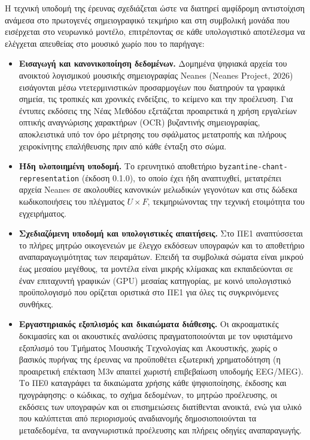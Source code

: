 \documentclass[11pt,a4paper]{article}
\begin{document}
Η τεχνική υποδομή της έρευνας σχεδιάζεται ώστε να διατηρεί αμφίδρομη αντιστοίχιση ανάμεσα στο πρωτογενές σημειογραφικό τεκμήριο και στη συμβολική μονάδα που εισέρχεται στο νευρωνικό μοντέλο, επιτρέποντας σε κάθε υπολογιστικό αποτέλεσμα να ελέγχεται απευθείας στο μουσικό χωρίο που το παρήγαγε:

\begin{itemize}
\item
  \textbf{Εισαγωγή και κανονικοποίηση δεδομένων.} Δομημένα ψηφιακά αρχεία του ανοικτού λογισμικού μουσικής σημειογραφίας Neanes (Neanes Project, 2026) εισάγονται μέσω ντετερμινιστικών προσαρμογέων που διατηρούν τα γραφικά σημεία, τις τροπικές και χρονικές ενδείξεις, το κείμενο και την προέλευση. Για έντυπες εκδόσεις της Νέας Μεθόδου εξετάζεται προαιρετικά η χρήση εργαλείων οπτικής αναγνώρισης χαρακτήρων (OCR) βυζαντινής σημειογραφίας, αποκλειστικά υπό τον όρο μέτρησης του σφάλματος μετατροπής και πλήρους χειροκίνητης επαλήθευσης πριν από κάθε ένταξη στο σώμα.
\item
  \textbf{Ήδη υλοποιημένη υποδομή.} Το ερευνητικό αποθετήριο \texttt{byzantine-chant-representation} (έκδοση 0.1.0), το οποίο έχει ήδη αναπτυχθεί, μετατρέπει αρχεία Neanes σε ακολουθίες κανονικών μελωδικών γεγονότων και στις δώδεκα κωδικοποιήσεις του πλέγματος \(U \times F\), τεκμηριώνοντας την τεχνική ετοιμότητα του εγχειρήματος.
\item
  \textbf{Σχεδιαζόμενη υποδομή και υπολογιστικές απαιτήσεις.} Στο ΠΕ1 αναπτύσσεται το πλήρες μητρώο οικογενειών με έλεγχο εκδόσεων υπογραφών και το αποθετήριο αναπαραγωγιμότητας των πειραμάτων. Επειδή τα συμβολικά σώματα είναι μικρού έως μεσαίου μεγέθους, τα μοντέλα είναι μικρής κλίμακας και εκπαιδεύονται σε έναν επιταχυντή γραφικών (GPU) μεσαίας κατηγορίας, με κοινό υπολογιστικό προϋπολογισμό που ορίζεται οριστικά στο ΠΕ1 για όλες τις συγκρινόμενες συνθήκες.
\item
  \textbf{Εργαστηριακός εξοπλισμός και δικαιώματα διάθεσης.} Οι ακροαματικές δοκιμασίες και οι ακουστικές αναλύσεις πραγματοποιούνται με τον υφιστάμενο εξοπλισμό του Τμήματος Μουσικής Τεχνολογίας και Ακουστικής, χωρίς ο βασικός πυρήνας της έρευνας να προϋποθέτει εξωτερική χρηματοδότηση (η προαιρετική επέκταση Μ3ν απαιτεί χωριστή επιβεβαίωση υποδομής EEG/MEG). Το ΠΕ0 καταγράφει τα δικαιώματα χρήσης κάθε ψηφιοποίησης, έκδοσης και ηχογράφησης: ο κώδικας, το σχήμα δεδομένων, το μητρώο προέλευσης, οι εκδόσεις των υπογραφών και οι επισημειώσεις διατίθενται ανοικτά, ενώ για υλικό που καλύπτεται από περιορισμούς αναδιανομής δημοσιοποιούνται τα μεταδεδομένα, τα αναγνωριστικά προέλευσης και πλήρεις οδηγίες αναπαραγωγής.
\end{itemize}
\end{document}
